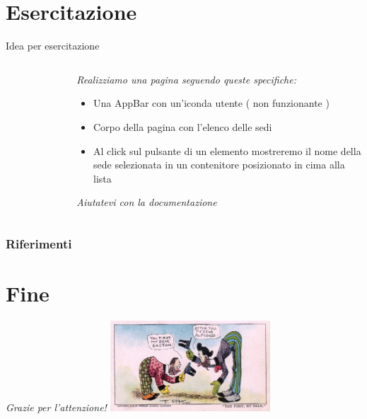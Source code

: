 \documentclass{../libs/presentation_format}
\begin{document}

\section{Esercitazione}
\begin{frame}{Idea per esercitazione}
	\begin{minipage}[0.2\textheight]{\textwidth}
		\begin{columns}[T]
			\begin{column}{0.4\textwidth}
				\begin{figure}[htpb]
					\centering
					\includegraphics[width=2cm]{../libs/Home - List-1}
				\end{figure}
			\end{column}
			\begin{column}{0.6\textwidth}
				\emph{Realizziamo una pagina seguendo queste specifiche:}
				\newline
				\begin{itemize}
					\item Una AppBar con un'iconda utente ( non funzionante )
					\item Corpo della pagina con l'elenco delle sedi
					\item Al click sul pulsante di un elemento mostreremo il nome della sede selezionata in un contenitore posizionato in cima alla lista
				\end{itemize}
				\emph{Aiutatevi con la documentazione}
			\end{column}
		\end{columns}
	\end{minipage}
\end{frame}


\begin{frame}[allowframebreaks]
    \frametitle{Riferimenti}
    \printbibliography
\end{frame}

\section{Fine}
\begin{frame}{}
	\huge\emph{Grazie per l'attenzione!}
	\newline
	\vfill
	\hfill\includegraphics[width=6cm]{../libs/alphonse-gaston-regards}
\end{frame}
\end{document}
